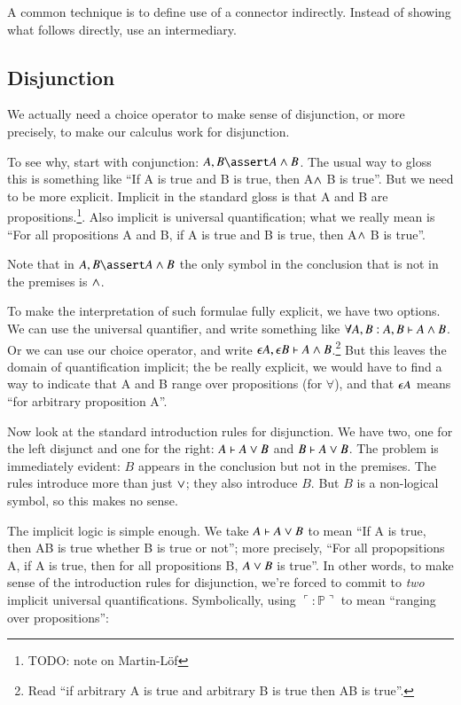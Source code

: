 \documentclass{article}
\begin{document}
A common technique is to define use of a connector indirectly.  Instead of showing what follows directly, use an intermediary.

\subsection{Disjunction}

We actually need a choice operator to make sense of disjunction, or
more precisely, to make our calculus work for disjunction.

To see why, start with conjunction: \(A, B\linfer A\lkand B\). The
usual way to gloss this is something like ``If A is true and B is
true, then A\(\land\) B is true''. But we need to be more explicit.
Implicit in the standard gloss is that A and B are
propositions.\footnote{TODO: note on Martin-Löf}. Also implicit is
universal quantification; what we really mean is ``For all
propositions A and B, if A is true and B is true, then A\(\land\) B
is true''.

Note that in \(A, B\linfer A\lkand B\) the only symbol in the
conclusion that is not in the premises is \(\land\).

To make the interpretation of such formulae fully explicit, we have
two options. We can use the universal quantifier, and write something
like \(\forall A, B: A, B\vdash A\land B\). Or we can use our choice
operator, and write \(\epsilon A, \epsilon B\vdash A\land
B\).\footnote{Read ``if arbitrary A is true and arbitrary B is true
then A\lkand B is true''.} But this leaves the domain of
quantification implicit; the be really explicit, we would have to find
a way to indicate that A and B range over propositions (for
\(\forall\)), and that \(\epsilon A\) means ``for arbitrary proposition
A''.

Now look at the standard introduction rules for disjunction. We have
two, one for the left disjunct and one for the right: \(A\vdash A\lor
B\) and \(B\vdash A\lor B\). The problem is immediately evident:
\(B\) appears in the conclusion but not in the premises. The rules
introduce more than just \(\lor\); they also introduce \(B\). But
\(B\) is a non-logical symbol, so this makes no sense.

The implicit logic is simple enough. We take \(A\vdash A\lor B\) to
mean ``If A is true, then A\lkor B is true whether B is true or not'';
more precisely, ``For all propopsitions A, if A is true, then for all
propositions B, \(A\lor B\) is true''. In other words, to make sense
of the introduction rules for disjunction, we're forced to commit to
\textit{two} implicit universal quantifications. Symbolically, using
\(\ulcorner :\mathbb{P}\urcorner\) to mean ``ranging over
propositions'':
\end{document}
